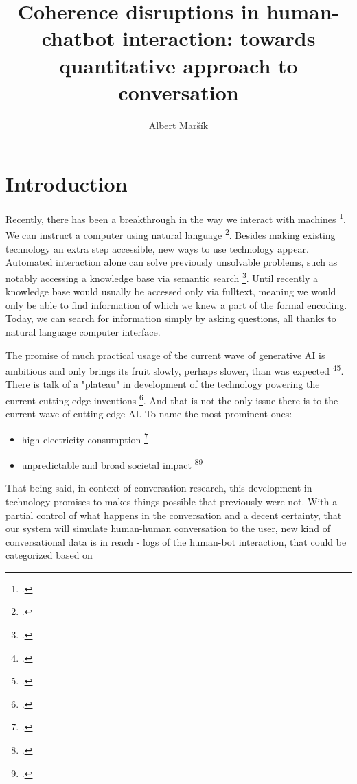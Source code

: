 \documentclass[12pt]{report}
\title{Coherence disruptions in human-chatbot interaction: towards quantitative approach to conversation}
\date{}
\author{Albert Maršík}
\begin{document}

\maketitle

\chapter*{Introduction}

\par
Recently, there has been a breakthrough in the way we interact with machines \footcite{sharma2024exploring}.
We can instruct a computer using natural language \footcite{hendrix1982natural}.
Besides making existing technology an extra step accessible,
new ways to use technology appear.
Automated interaction alone can solve previously unsolvable problems,
such as notably accessing a knowledge base via semantic search \footcite{makela2005survey}.
Until recently a knowledge base would usually be accessed only via fulltext,
meaning we would only be able to find
information of which we knew a part of the formal encoding.
Today, we can search for information simply by asking questions,
all thanks to natural language computer interface.
\par
The promise of much practical usage of the current wave of generative AI is ambitious
and only brings its fruit slowly, perhaps slower, than was expected
\footcite{bloomberg2024openai1}\footcite{reuters2024openai}.
There is talk of a "plateau" in development of the technology powering the current cutting edge inventions \footcite{ritter2024ai}.
And that is not the only issue there is to the current wave of cutting edge AI. To name the most prominent ones:

\begin{itemize}

    \item
    high electricity consumption \footcite{ritchie2024ai}

    \item
    unpredictable and broad societal impact \footcite{hagerty2019global}\footcite{baldassarre2023social}
\end{itemize}

That being said, in context of conversation research,
this development in technology promises to makes things possible that previously were not.
With a partial control of what happens in the conversation and a decent certainty, that
our system will simulate human-human conversation to the user,
new kind of conversational data is in reach -
logs of the human-bot interaction, that could be categorized based on
\end{document}
